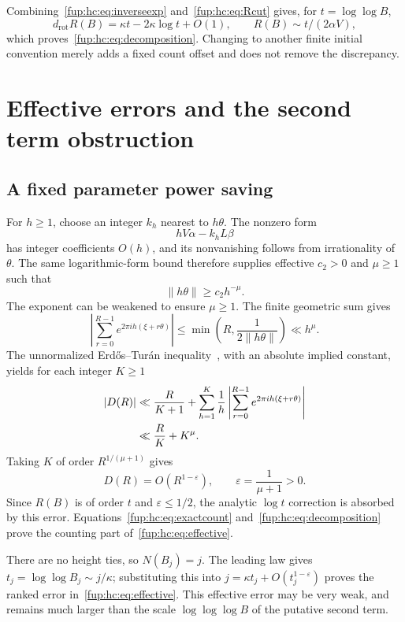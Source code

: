 \documentclass[11pt,letterpaper]{article}
\theoremstyle{definition}\newtheorem{definition}[theorem]{Definition}
\theoremstyle{remark}\newtheorem{remark}[theorem]{Remark}
\newcommand{\drot}{d_{\mathrm{rot}}}
\begin{document}
Combining~\eqref{fup:hc:eq:inverseexp} and~\eqref{fup:hc:eq:Rcut} gives, for $t=\log\log B$,
\[
 \drot R(B)=\kappa t-2\kappa\log t+O(1),\qquad
 R(B)\sim t/(2\alpha V),
\]
which proves~\eqref{fup:hc:eq:decomposition}. Changing to another finite initial convention merely adds a fixed count offset and does not remove the discrepancy.

\section{Effective errors and the second term obstruction}\label{fup:hc:sec:errors}
\subsection{A fixed parameter power saving}
For $h\ge1$, choose an integer $k_h$ nearest to $h\theta$. The nonzero form
\[
 hV\alpha-k_hL\beta
\]
has integer coefficients $O(h)$, and its nonvanishing follows from irrationality of $\theta$. The same logarithmic-form bound therefore supplies effective $c_2>0$ and $\mu\ge1$ such that
\begin{equation}\label{fup:hc:eq:diophantine}
 \|h\theta\|\ge c_2h^{-\mu}.
\end{equation}
The exponent can be weakened to ensure $\mu\ge1$. The finite geometric sum gives
\[
 \left|\sum_{r=0}^{R-1}e^{2\pi ih(\xi+r\theta)}\right|
 \le\min\left(R,\frac1{2\|h\theta\|}\right)\ll h^\mu.
\]
The unnormalized Erd\H{o}s--Tur\'an inequality~\cite{fup:hc:et1,fup:hc:et2}, with an absolute implied constant, yields for each integer $K\ge1$
\begin{align}\label{fup:hc:eq:ET}
 |D(R)|&\ll\frac{R}{K+1}+
 \sum_{h=1}^K\frac1h
 \left|\sum_{r=0}^{R-1}e^{2\pi ih(\xi+r\theta)}\right|\notag\\
 &\ll\frac RK+K^\mu.
\end{align}
Taking $K$ of order $R^{1/(\mu+1)}$ gives
\begin{equation}\label{fup:hc:eq:powersaving}
 D(R)=O(R^{1-\varepsilon}),\qquad \varepsilon=\frac1{\mu+1}>0.
\end{equation}
Since $R(B)$ is of order $t$ and $\varepsilon\le1/2$, the analytic $\log t$ correction is absorbed by this error. Equations~\eqref{fup:hc:eq:exactcount} and~\eqref{fup:hc:eq:decomposition} prove the counting part of~\eqref{fup:hc:eq:effective}.

There are no height ties, so $N(B_j)=j$. The leading law gives $t_j=\log\log B_j\sim j/\kappa$; substituting this into $j=\kappa t_j+O(t_j^{1-\varepsilon})$ proves the ranked error in~\eqref{fup:hc:eq:effective}. This effective error may be very weak, and remains much larger than the scale $\log\log\log B$ of the putative second term.
\end{document}
